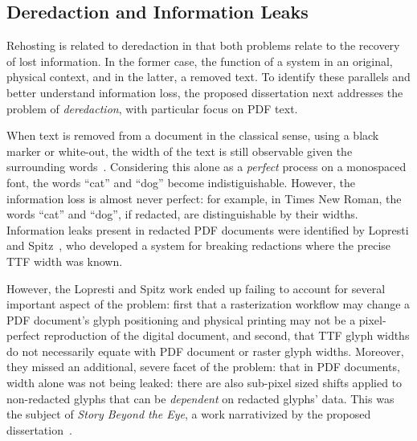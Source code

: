\subsection{Deredaction and Information Leaks}
Rehosting is related to deredaction in that both problems relate to the recovery of lost information.
In the former case, the function of a system in an original, physical context, and in the latter, a removed text.
To identify these parallels and better understand information loss, the proposed dissertation next addresses the problem of \emph{deredaction}, with particular focus on PDF text.

When text is removed from a document in the classical sense, using a black marker or white-out, the width of the text is still observable given the surrounding words~\cite{egyptian}.
Considering this alone as a \emph{perfect} process on a monospaced font, the words ``cat'' and ``dog'' become indistiguishable.
However, the information loss is almost never perfect: for example, in Times New Roman, the words ``cat'' and ``dog'', if redacted, are distinguishable by their widths.
Information leaks present in redacted PDF documents were identified by Lopresti and Spitz~\cite{lopresti2004quantifying}, who developed a system for breaking redactions where the precise TTF width was known.

However, the Lopresti and Spitz work ended up failing to account for several important aspect of the problem: first that a rasterization workflow may change a PDF document's glyph positioning and physical printing may not be a pixel-perfect reproduction of the digital document, and second, that TTF glyph widths do not necessarily equate with PDF document or raster glyph widths.
Moreover, they missed an additional, severe facet of the problem: that in PDF documents, width alone was not being leaked: there are also sub-pixel sized shifts applied to non-redacted glyphs that can be \emph{dependent} on redacted glyphs' data.
This was the subject of \emph{Story Beyond the Eye}, a work narrativized by the proposed dissertation~\cite{bland2022story}.


